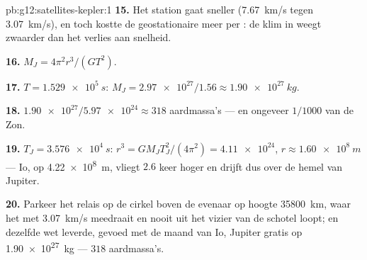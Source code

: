 \begin{solution}{pb:g12:satellites-kepler:1}
\textbf{15.} Het station gaat sneller (\qty{7.67}{km/s} tegen
\qty{3.07}{km/s}), en toch kostte de geostationaire meer  per
: de klim in  weegt zwaarder dan het verlies aan
snelheid.

\textbf{16.} $M_J = 4\pi^2 r^3/(G T^2)$.

\textbf{17.} $T = \qty{1.529e5}{s}$: $M_J = \num{2.97e27}/1.56 \approx
\qty{1.90e27}{kg}$.

\textbf{18.} $\num{1.90e27}/\num{5.97e24} \approx 318$ aardmassa's --- en
ongeveer $1/1000$ van de Zon.

\textbf{19.} $T_J = \qty{3.576e4}{s}$: $r^3 = GM_J T_J^2/(4\pi^2) =
\num{4.11e24}$, $r \approx \qty{1.60e8}{m}$ --- Io, op \qty{4.22e8}{m},
vliegt $2.6$ keer hoger en drijft dus over de hemel van Jupiter.

\textbf{20.} Parkeer het relais op de cirkel boven de evenaar op hoogte
\qty{35800}{km}, waar het met \qty{3.07}{km/s} meedraait en nooit uit het
vizier van de schotel loopt; en dezelfde wet leverde, gevoed met de maand van
Io, Jupiter gratis op \qty{1.90e27}{kg} --- $318$ aardmassa's.
\end{solution}
